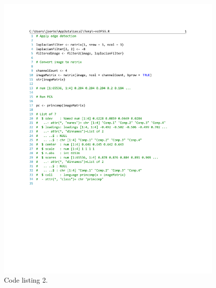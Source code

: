 \documentclass[conference,compsoc]{IEEEtran}
\begin{document}
\begin{figure}[!t]
\centering
\includegraphics[width=7in]{code-listing-2.pdf}
\caption{Code listing 2.}
\label{code-listing-2}
\end{figure}
\end{document}
